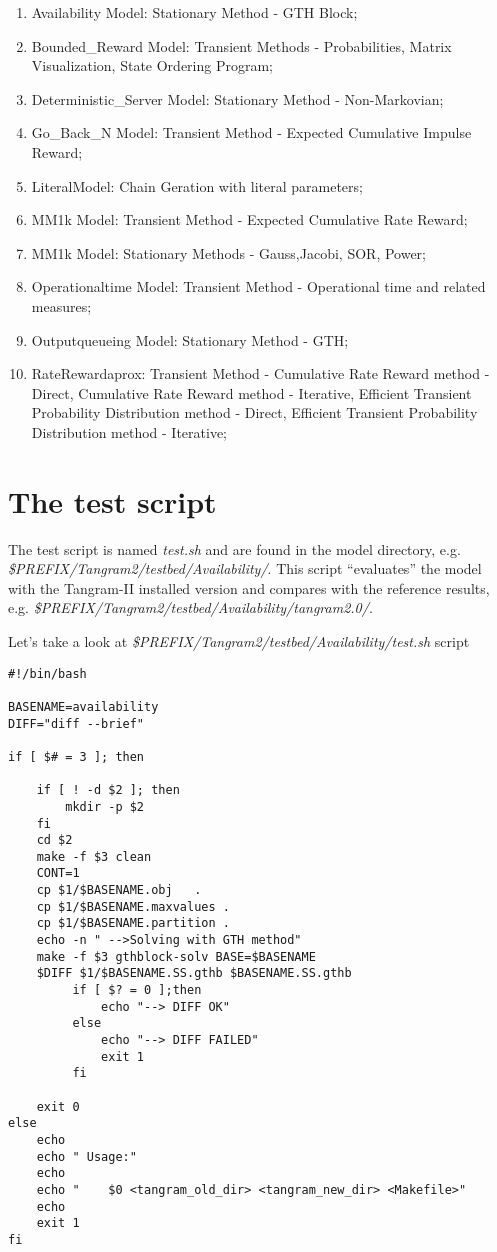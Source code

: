 \documentclass[english]{article}
\begin{document}
\begin{enumerate}
\item Availability Model: Stationary Method - GTH Block;
\item Bounded\_Reward Model: Transient Methods - Probabilities, Matrix Visualization, State Ordering Program;
\item Deterministic\_Server Model: Stationary Method - Non-Markovian;
\item Go\_Back\_N Model: Transient Method - Expected Cumulative Impulse Reward;
\item LiteralModel: Chain Geration with literal parameters;
\item MM1k Model: Transient Method - Expected Cumulative Rate Reward;
\item MM1k Model: Stationary Methods - Gauss,Jacobi, SOR, Power;
\item Operationaltime Model: Transient Method - Operational time and related measures;
\item Outputqueueing Model: Stationary Method - GTH;
\item RateRewardaprox: Transient Method - Cumulative Rate Reward method - Direct, Cumulative Rate Reward method - Iterative, Efficient Transient Probability Distribution method - Direct, Efficient Transient Probability Distribution method - Iterative;
\end{enumerate} 


\section{The test script}

The test script is named {\it test.sh} and are found in the model directory, e.g. {\it \$PREFIX/Tangram2/testbed/Availability/}. This script ``evaluates'' the model with the Tangram-II installed version and compares with the reference results, e.g. {\it \$PREFIX/Tangram2/testbed/Availability/tangram2.0/}.

Let's take a look at {\it \$PREFIX/Tangram2/testbed/Availability/test.sh} script

\begin{verbatim}
#!/bin/bash

BASENAME=availability
DIFF="diff --brief"

if [ $# = 3 ]; then
    
    if [ ! -d $2 ]; then
        mkdir -p $2
    fi    
    cd $2
    make -f $3 clean
    CONT=1 
    cp $1/$BASENAME.obj   .
    cp $1/$BASENAME.maxvalues .
    cp $1/$BASENAME.partition .
    echo -n " -->Solving with GTH method"
    make -f $3 gthblock-solv BASE=$BASENAME     
    $DIFF $1/$BASENAME.SS.gthb $BASENAME.SS.gthb
         if [ $? = 0 ];then
             echo "--> DIFF OK"
         else
             echo "--> DIFF FAILED"
             exit 1
         fi
         
    exit 0
else
    echo
    echo " Usage:"
    echo
    echo "    $0 <tangram_old_dir> <tangram_new_dir> <Makefile>"
    echo
    exit 1
fi
\end{verbatim}
\end{document}
